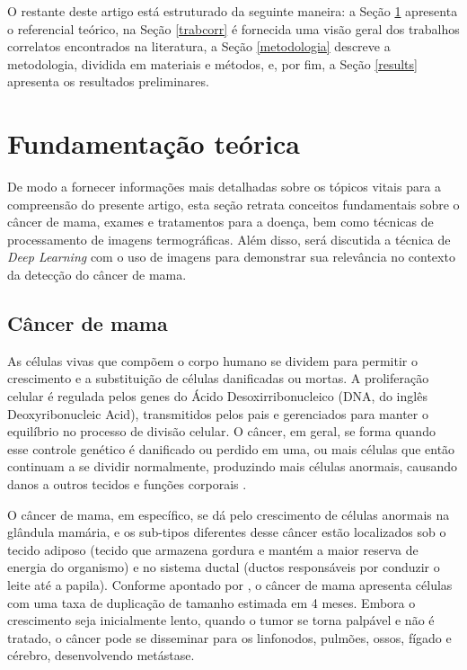O restante deste artigo está estruturado da seguinte maneira: a Seção \ref{fundteorica} apresenta o referencial teórico, na Seção \ref{trabcorr} é fornecida uma visão geral dos trabalhos correlatos encontrados na literatura, a Seção \ref{metodologia} descreve a metodologia, dividida em materiais e métodos, e, por fim, a Seção \ref{results} apresenta os resultados preliminares. 




\section{\esp Fundamentação teórica}  \label{fundteorica}

De modo a fornecer informações mais detalhadas sobre os tópicos vitais para a compreensão do presente artigo, esta seção retrata conceitos fundamentais sobre o câncer de mama, exames e tratamentos para a doença, bem como técnicas de processamento de imagens termográficas. Além disso, será discutida a técnica de \textit{Deep Learning} com o uso de imagens para demonstrar sua relevância no contexto da detecção do câncer de mama.


\subsection{\esp Câncer de mama} \label{cancerdemama}
As células vivas que compõem o corpo humano se dividem para permitir o crescimento e a substituição de células danificadas ou mortas. A proliferação celular é regulada pelos genes do Ácido Desoxirribonucleico (DNA, do inglês Deoxyribonucleic Acid), transmitidos pelos pais e gerenciados para manter o equilíbrio no processo de divisão celular. O câncer, em geral, se forma quando esse controle genético é danificado ou perdido em uma, ou mais células que então continuam a se dividir normalmente, produzindo mais células anormais, causando danos a outros tecidos e funções corporais \cite{basicOncology}.

O câncer de mama, em específico, se dá pelo crescimento de células anormais na glândula mamária, e os sub-tipos diferentes desse câncer estão localizados sob o tecido adiposo (tecido que armazena gordura e mantém a maior reserva de energia do organismo) e no sistema ductal (ductos responsáveis por conduzir o leite até a papila). Conforme apontado por , o câncer de mama apresenta células com uma taxa de duplicação de tamanho estimada em 4 meses. Embora o crescimento seja inicialmente lento, quando o tumor se torna palpável e não é tratado, o câncer pode se disseminar para os linfonodos, pulmões, ossos, fígado e cérebro, desenvolvendo metástase.

